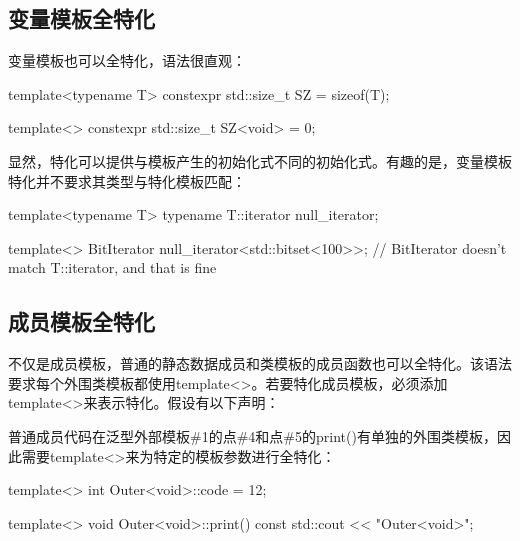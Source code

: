 \subsection{变量模板全特化}

变量模板也可以全特化，语法很直观：

\begin{cpp}
template<typename T> constexpr std::size_t SZ = sizeof(T);

template<> constexpr std::size_t SZ<void> = 0;
\end{cpp}

显然，特化可以提供与模板产生的初始化式不同的初始化式。有趣的是，变量模板特化并不要求其类型与特化模板匹配：

\begin{cpp}
template<typename T> typename T::iterator null_iterator;

template<> BitIterator null_iterator<std::bitset<100>>;
// BitIterator doesn't match T::iterator, and that is fine
\end{cpp}

\subsection{成员模板全特化}

不仅是成员模板，普通的静态数据成员和类模板的成员函数也可以全特化。该语法要求每个外围类模板都使用template<>。若要特化成员模板，必须添加template<>来表示特化。假设有以下声明：


普通成员代码在泛型外部模板\#1的点\#4和点\#5的print()有单独的外围类模板，因此需要template<>来为特定的模板参数进行全特化：

\begin{cpp}
template<>
int Outer<void>::code = 12;

template<>
void Outer<void>::print() const
{
	std::cout << "Outer<void>";
}
\end{cpp}

